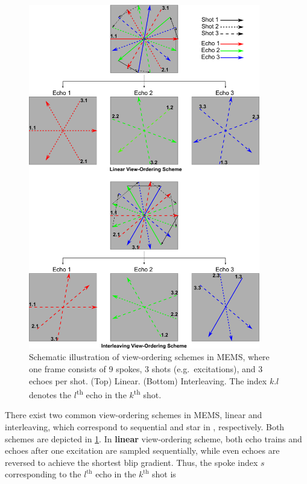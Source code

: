 \begin{figure}[p]
  \centering
  \includegraphics[width=0.90\textwidth]{fig/multi-echo-multi-spoke-vo.png}
  \caption{Schematic illustration of view-ordering schemes in MEMS, where one frame consists of \num{9} spokes, \num{3} shots (e.g.~excitations), and \num{3} echoes per shot. (Top) Linear. (Bottom) Interleaving. The index $k$.$l$ denotes the $l$\textsuperscript{th} echo in the $k$\textsuperscript{th} shot.} \label{Fig:multi-echo-multi-spoke-vo}
\end{figure}
There exist two common view-ordering schemes in MEMS, linear and interleaving, which correspond to sequential and star in \cite{2004_vo_rFSE}, respectively. Both schemes are depicted in \cref{Fig:multi-echo-multi-spoke-vo}. In \textbf{linear} view-ordering scheme, both echo trains and echoes after one excitation are sampled sequentially, while even echoes are reversed to achieve the shortest blip gradient. Thus, the spoke index $s$ corresponding to the $l^{\text{th}}$ echo in the $k^{\text{th}}$ shot is
